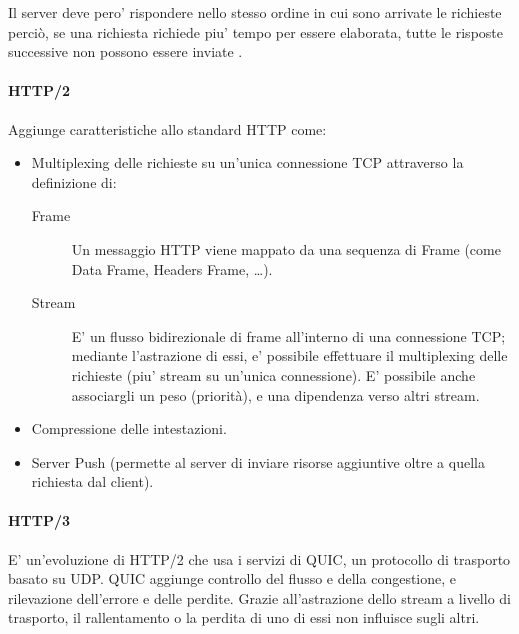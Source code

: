 Il server deve pero' rispondere nello stesso ordine in cui sono arrivate le richieste perciò, se una richiesta richiede piu' tempo per essere elaborata, tutte le risposte successive non possono essere inviate .
\paragraph{HTTP/2}
Aggiunge caratteristiche allo standard HTTP come:
\begin{itemize}
    \item Multiplexing delle richieste su un'unica connessione TCP attraverso la definizione di:
    \begin{description}
        \item[Frame] Un messaggio HTTP viene mappato da una sequenza di Frame (come Data Frame, Headers Frame, \dots).
        \item[Stream] E' un flusso bidirezionale di frame all'interno di una connessione TCP; mediante l'astrazione di essi, e' possibile effettuare il multiplexing delle richieste (piu' stream su un'unica connessione). E' possibile anche associargli un peso (priorità), e una dipendenza verso altri stream.
    \end{description}
    \item Compressione delle intestazioni.
    \item Server Push (permette al server di inviare risorse aggiuntive oltre a quella richiesta dal client).
\end{itemize}
\paragraph{HTTP/3}
E' un'evoluzione di HTTP/2 che usa i servizi di QUIC, un protocollo di trasporto basato su UDP. QUIC aggiunge controllo del flusso e della congestione, e rilevazione dell'errore e delle perdite. Grazie all'astrazione dello stream a livello di trasporto, il rallentamento o la perdita di uno di essi non influisce sugli altri.

